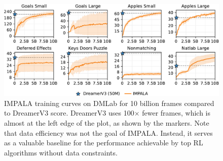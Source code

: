 \begin{figure}[h]
\centering
\includegraphics[width=1\linewidth]{dmlab_eff/dmlab_eff}
\caption{IMPALA training curves on DMLab for 10 billion frames compared to DreamerV3 score. DreamerV3 uses 100$\times$ fewer frames, which is almost at the left edge of the plot, as shown by the markers. Note that data efficiency was not the goal of IMPALA. Instead, it serves as a valuable baseline for the performance achievable by top RL algorithms without data constraints.}
\label{fig:dmlab_eff}
\end{figure}
